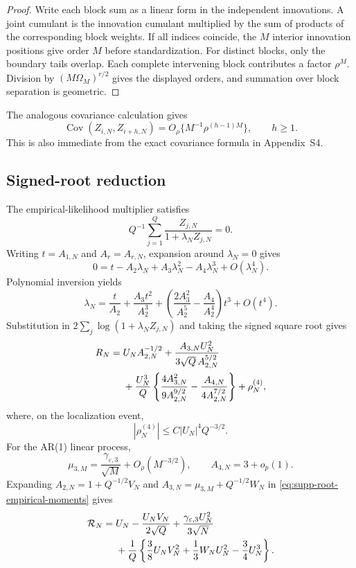 \documentclass[12pt]{article}
\theoremstyle{remark}
\begin{document}
\begin{proof}
Write each block sum as a linear form in the independent innovations. A joint cumulant is the innovation cumulant multiplied by the sum of products of the corresponding block weights. If all indices coincide, the $M$ interior innovation positions give order $M$ before standardization. For distinct blocks, only the boundary tails overlap. Each complete intervening block contributes a factor $\rho^M$. Division by $(M\Omega_M)^{r/2}$ gives the displayed orders, and summation over block separation is geometric.
\end{proof}

The analogous covariance calculation gives
\begin{equation}
\operatorname{Cov}(Z_{i,N},Z_{i+h,N})
=O_\rho\{M^{-1}\rho^{(h-1)M}\},
\qquad h\ge1.
\label{eq:supp-cross-block-cov-order}
\end{equation}
This is also immediate from the exact covariance formula in Appendix~S4.

\subsection{Signed-root reduction}
The empirical-likelihood multiplier satisfies
\[
Q^{-1}\sum_{j=1}^Q\frac{Z_{j,N}}{1+\lambda_NZ_{j,N}}=0.
\]
Writing $t=A_{1,N}$ and $A_r=A_{r,N}$, expansion around $\lambda_N=0$ gives
\[
0=t-A_2\lambda_N+A_3\lambda_N^2-A_4\lambda_N^3+O(\lambda_N^4).
\]
Polynomial inversion yields
\[
\lambda_N
=
\frac{t}{A_2}
+\frac{A_3t^2}{A_2^3}
+\left(\frac{2A_3^2}{A_2^5}-\frac{A_4}{A_2^4}\right)t^3
+O(t^4).
\]
Substitution in $2\sum_j\log(1+\lambda_NZ_{j,N})$ and taking the signed square root gives
\begin{align}
R_N
={}&
U_NA_{2,N}^{-1/2}
+\frac{A_{3,N}U_N^2}{3\sqrt Q\,A_{2,N}^{5/2}}
\notag\\
&+
\frac{U_N^3}{Q}
\left\{
\frac{4A_{3,N}^2}{9A_{2,N}^{9/2}}
-\frac{A_{4,N}}{4A_{2,N}^{7/2}}
\right\}
+\rho_N^{(4)},
\label{eq:supp-root-empirical-moments}
\end{align}
where, on the localization event,
\[
|\rho_N^{(4)}|
\le C|U_N|^4Q^{-3/2}.
\]
For the AR(1) linear process,
\[
\mu_{3,M}
=\frac{\gamma_{\varepsilon,3}}{\sqrt M}+O_\rho(M^{-3/2}),
\qquad
A_{4,N}=3+o_p(1).
\]
Expanding $A_{2,N}=1+Q^{-1/2}V_N$ and
$A_{3,N}=\mu_{3,M}+Q^{-1/2}W_N$ in
\eqref{eq:supp-root-empirical-moments} gives
\begin{align}
\mathcal R_N
={}&
U_N-\frac{U_NV_N}{2\sqrt Q}
+\frac{\gamma_{\varepsilon,3}U_N^2}{3\sqrt N}
\notag\\
&+
\frac1Q
\left\{
\frac38U_NV_N^2
+\frac13W_NU_N^2
-\frac34U_N^3
\right\}.
\label{eq:supp-polynomial-root}
\end{align}
\end{document}
